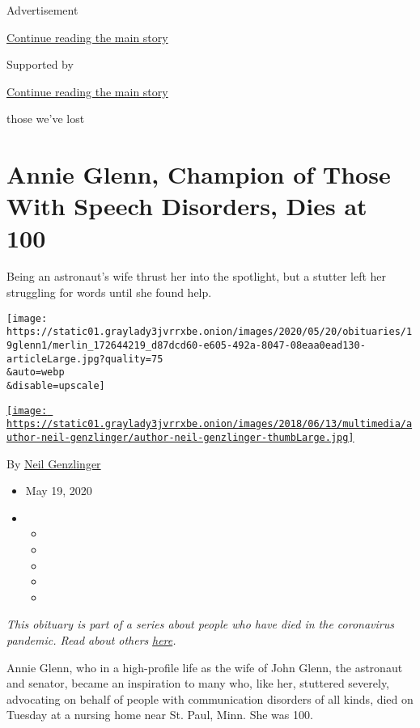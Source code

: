 Advertisement

\protect\hyperlink{after-top}{Continue reading the main story}

Supported by

\protect\hyperlink{after-sponsor}{Continue reading the main story}

those we've lost

\hypertarget{annie-glenn-champion-of-those-with-speech-disorders-dies-at-100}{%
\section{Annie Glenn, Champion of Those With Speech Disorders, Dies at
100}\label{annie-glenn-champion-of-those-with-speech-disorders-dies-at-100}}

Being an astronaut's wife thrust her into the spotlight, but a stutter
left her struggling for words until she found help.

\texttt{[image: https://static01.graylady3jvrrxbe.onion/images/2020/05/20/obituaries/19glenn1/merlin\_172644219\_d87dcd60-e605-492a-8047-08eaa0ead130-articleLarge.jpg?quality=75\\\&auto=webp\\\&disable=upscale]}

\href{https://www.nytimes3xbfgragh.onion/by/neil-genzlinger}{\texttt{[image: https://static01.graylady3jvrrxbe.onion/images/2018/06/13/multimedia/author-neil-genzlinger/author-neil-genzlinger-thumbLarge.jpg]}}

By \href{https://www.nytimes3xbfgragh.onion/by/neil-genzlinger}{Neil
Genzlinger}

\begin{itemize}
\item
  May 19, 2020
\item
  \begin{itemize}
  \item
  \item
  \item
  \item
  \item
  \end{itemize}
\end{itemize}

\emph{This obituary is part of a series about people who have died in
the coronavirus pandemic. Read about others}
\href{https://www.nytimes3xbfgragh.onion/series/people-who-have-died-of-the-coronavirus}{\emph{here}}\emph{.}

Annie Glenn, who in a high-profile life as the wife of John Glenn, the
astronaut and senator, became an inspiration to many who, like her,
stuttered severely, advocating on behalf of people with communication
disorders of all kinds, died on Tuesday at a nursing home near St. Paul,
Minn. She was 100.

